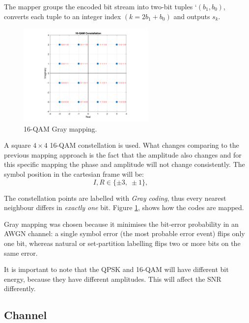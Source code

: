 The mapper groups the encoded bit stream into two-bit tuples `$(b_1,b_0)$, converts each tuple to an integer index $(k =2b_1+b_0)$ and outputs \(s_k\).


\begin{figure}[h]
  \centering
  \includegraphics[width=0.6\textwidth]{Images/16-QAM_Constellation.png}
  \caption{16-QAM Gray mapping.}
  \label{fig:QAM_Mapping}
\end{figure}


A square $4\times4$ 16-QAM constellation is used. What changes comparing to the previous mapping approach is the fact that the amplitude also changes and for this specific mapping the phase and amplitude will not change consistently. The symbol position in the cartesian frame will be:
\[
I,R \in \{\pm3,\;\pm1\},\qquad
\]

The constellation points are labelled with \emph{Gray coding}, thus every nearest neighbour differs in \emph{exactly one} bit. Figure \ref{fig:QAM_Mapping}, shows how the codes are mapped.
 
Gray mapping was chosen because it minimises the bit‑error probability in an AWGN channel: a single symbol error (the most probable error event) flips only one bit, whereas natural or set‑partition labelling flips two or more bits on the same error.  

It is important to note that the QPSK and 16-QAM will have different bit energy, because they have different amplitudes. This will affect the SNR differently.

\subsection{Channel}


